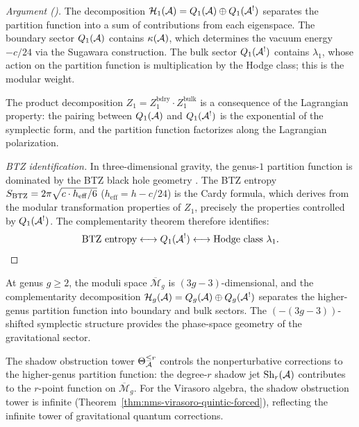 \begin{proof}[Argument \textup{(}\ClaimStatusHeuristic{}\textup{)}]
The decomposition
$\mathcal{H}_1(\mathcal{A}) = Q_1(\mathcal{A}) \oplus Q_1(\mathcal{A}^!)$
separates the partition function into a sum of contributions
from each eigenspace. The boundary sector $Q_1(\mathcal{A})$
contains $\kappa(\mathcal{A})$, which determines the vacuum energy
$-c/24$ via the Sugawara construction. The bulk sector
$Q_1(\mathcal{A}^!)$ contains $\lambda_1$, whose action on the
partition function is multiplication by the Hodge class;
this is the modular weight.

The product decomposition
$Z_1 = Z_1^{\mathrm{bdry}} \cdot Z_1^{\mathrm{bulk}}$
is a consequence of the Lagrangian property: the pairing
between $Q_1(\mathcal{A})$ and $Q_1(\mathcal{A}^!)$ is the exponential
of the symplectic form, and the partition function
factorizes along the Lagrangian polarization.

\emph{BTZ identification.}
In three-dimensional gravity, the genus-$1$ partition function
is dominated by the BTZ black hole geometry
\cite{BTZ92, Maloney-Witten07}.
The BTZ entropy $S_{\mathrm{BTZ}} = 2\pi\sqrt{c \cdot h_{\mathrm{eff}} / 6}$
\textup{(}$h_{\mathrm{eff}} = h - c/24$\textup{)}
is the Cardy formula, which derives from the
modular transformation properties of $Z_1$, precisely
the properties controlled by $Q_1(\mathcal{A}^!)$.
The complementarity theorem therefore identifies:
\[
\text{BTZ entropy} \longleftrightarrow Q_1(\mathcal{A}^!)
\longleftrightarrow \text{Hodge class } \lambda_1.
\]
\end{proof}

\begin{remark}
\label{rem:thqg-III-higher-genus}
At genus $g \ge 2$, the moduli space
$\overline{\mathcal{M}}_g$ is $(3g-3)$-dimensional, and the
complementarity decomposition
$\mathcal{H}_g(\mathcal{A}) = Q_g(\mathcal{A}) \oplus Q_g(\mathcal{A}^!)$
separates the higher-genus partition function into boundary
and bulk sectors. The $(-(3g-3))$-shifted symplectic structure
provides the phase-space geometry of the gravitational sector.

The shadow obstruction tower $\Theta_{\mathcal{A}}^{\le r}$ controls the
nonperturbative corrections to the higher-genus partition
function: the degree-$r$ shadow jet $\mathrm{Sh}_r(\mathcal{A})$ contributes
to the $r$-point function on $\overline{\mathcal{M}}_g$.
For the Virasoro algebra, the shadow obstruction tower is infinite
(Theorem~\ref{thm:nms-virasoro-quintic-forced}), reflecting
the infinite tower of gravitational quantum corrections.
\end{remark}

